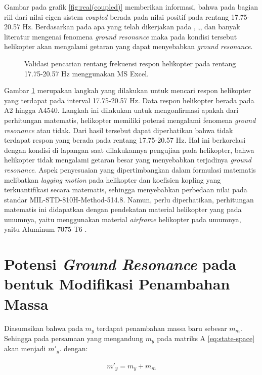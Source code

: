 Gambar pada grafik \ref{fig:real(coupled)} memberikan informasi, bahwa pada bagian riil dari nilai eigen sistem \textit{coupled} berada pada nilai positif pada rentang 17.75-20.57 Hz. Berdasarkan pada apa yang telah dikerjakan pada \cite{BERGEOT201672}, \cite{Eckert2007AnalyticalAA},\cite{Bergeot_passive}, dan banyak literatur mengenai fenomena \textit{ground resonance} maka pada kondisi tersebut helikopter akan mengalami getaran yang dapat menyebabkan \textit{ground resonance}. 

\begin{figure}[H]
	\centering
	\caption{Validasi pencarian rentang frekuensi respon helikopter pada rentang 17.75-20.57 Hz menggunakan MS Excel.}
	\label{fig:resonance_range}
\end{figure}

Gambar \ref{fig:resonance_range} merupakan langkah yang dilakukan untuk mencari respon helikopter yang terdapat pada interval 17.75-20.57 Hz. Data respon helikopter berada pada A2 hingga A4540. Langkah ini dilakukan untuk mengonfirmasi apakah dari perhitungan matematis, helikopter memiliki potensi mengalami fenomena \textit{ground resonance} atau tidak. Dari hasil tersebut dapat diperhatikan bahwa tidak terdapat respon yang berada pada rentang 17.75-20.57 Hz. Hal ini berkorelasi dengan kondisi di lapangan saat dilakukannya pengujian pada helikopter, bahwa helikopter tidak mengalami getaran besar yang menyebabkan terjadinya \textit{ground resonance}. Aspek penyesuaian yang dipertimbangkan dalam formulasi matematis melibatkan \textit{lagging motion} pada helikopter dan koefisien kopling yang terkuantifikasi secara matematis, sehingga menyebabkan perbedaan nilai pada standar MIL-STD-810H-Method-514.8. Namun, perlu diperhatikan, perhitungan matematis ini didapatkan dengan pendekatan material helikopter yang pada umumnya, yaitu menggunakan material \textit{airframe} helikopter pada umumnya, yaitu Aluminum 7075-T6 \cite{ASTM}.

\section{Potensi \textit{Ground Resonance} pada bentuk Modifikasi Penambahan Massa}

Diasumsikan bahwa pada $m_y$ terdapat penambahan massa baru sebesar $m_m$. Sehingga pada persamaan yang mengandung $m_y$ pada matriks A \ref{eq:state-space} akan menjadi $m'_y$. dengan:

\begin{align}
	\label{eq:modified}
	m'_y=m_y+m_m
\end{align}

